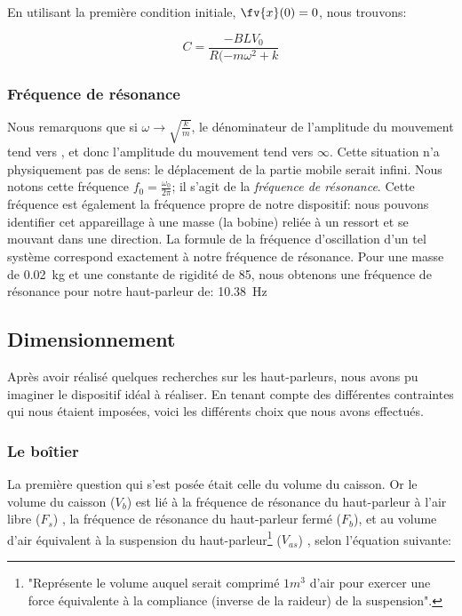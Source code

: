 En utilisant la première condition initiale, $\fv{x}(0) = 0$, nous trouvons:

$$C = \frac{-BLV_0}{R(-m\omega^2+k}$$



\subsubsection{Fréquence de résonance}
Nous remarquons que si $\omega \rightarrow \sqrt{\frac{k}{m}}$, le dénominateur de l'amplitude du mouvement
tend vers , et donc l'amplitude du mouvement tend vers $\infty$. Cette situation n'a physiquement
pas de sens: le déplacement de la partie mobile serait infini. Nous notons cette fréquence $f_0 = \frac{\omega_0}{2\pi}$; il s'agit de la \textit{fréquence de résonance}.
Cette fréquence est également la fréquence propre de notre dispositif: nous pouvons identifier cet appareillage à une masse (la bobine) reliée à un ressort et se mouvant dans une direction. La formule de la fréquence d'oscillation d'un tel système correspond exactement à notre fréquence de résonance\cite{resonance}. Pour une masse de \SI{0.02}{\kilogram} et une constante de rigidité de \SI{85}{\frac{\newton}{\meter}}, nous obtenons une fréquence de résonance pour notre haut-parleur de: \SI{10.38}{\hertz}



\subsection{Dimensionnement}
Après avoir réalisé quelques recherches sur les haut-parleurs, nous avons pu imaginer le dispositif idéal
à réaliser. En tenant compte des différentes contraintes qui nous étaient imposées, voici les différents
choix que nous avons effectués.

\subsubsection{Le boîtier}
La première question qui s'est posée était celle du volume du caisson. Or le volume du caisson ($V_b$) est
lié à la fréquence de résonance du
haut-parleur à l'air libre ($F_s$) , la fréquence de résonance du haut-parleur fermé ($F_b$), et au volume
d'air équivalent à la suspension du haut-parleur\footnote{"Représente le volume auquel serait comprimé
$1m^{3}$ d'air pour exercer une force équivalente à la compliance (inverse de la raideur) de la suspension"\cite{Vas}.}
($V_{as}$) , selon l'équation suivante\cite{Vas}:

